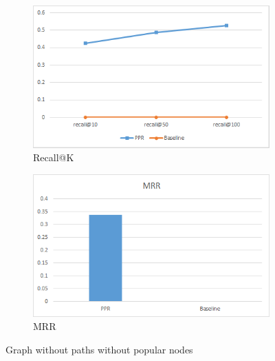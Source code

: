 \documentclass[11pt,oneside]{book}
\begin{document}
\begin{figure}[h]
\centering
\begin{subfigure}[b]{0.49\textwidth}
	\centering
\includegraphics[scale=0.49]{figures/minlen2remove500.png}
\caption{Recall@K}
\label{fig:minlen2remove500Recall}
\end{subfigure}
\begin{subfigure}[b]{0.49\textwidth}
	\centering
\includegraphics[scale=0.49]{figures/minlen2remove500MRR.png}
\caption{MRR}
\label{fig:minlen2remove500MRR}
\end{subfigure}
	\caption{Graph without paths without popular nodes}
	\label{fig:minlen2remove500}
\end{figure}
\end{document}
